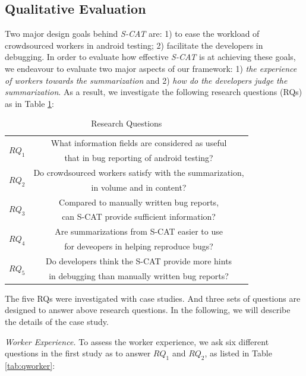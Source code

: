 \documentclass[10pt,conference]{IEEEtran}
\begin{document}
\subsection{Qualitative Evaluation}

Two major design goals behind \emph{S-CAT} are: 1) to ease the workload of crowdsourced workers in android testing; 2) facilitate
the developers in debugging. In order to evaluate how effective \emph{S-CAT} is at achieving these goals, we endeavour to evaluate
two major aspects of our framework: 1) \emph{the experience of workers towards the summarization} and 2) \emph{how do the developers
judge the summarization}. As a result, we investigate the following research questions (RQs) as in Table \ref{tab:rq}:

\begin{table}[!h]
\centering
\small
\caption{Research Questions}
\begin{tabular}{c|c} \hline
  \multirow{2}{*}{$RQ_1$} & What information fields are considered as useful\\& that in bug reporting of android testing?\\\hline
  \multirow{2}{*}{$RQ_2$} &Do crowdsourced workers satisfy with the summarization,\\& in volume and in content?\\ \hline
  \multirow{2}{*}{$RQ_3$} &Compared to manually written bug reports,\\& can S-CAT provide sufficient information?\\ \hline
  \multirow{2}{*}{$RQ_4$} &Are summarizations from S-CAT easier to use\\& for deveopers in helping reproduce bugs?\\ \hline
  \multirow{2}{*}{$RQ_5$} &Do developers think the S-CAT provide more hints\\& in debugging than manually written bug reports?\\ \hline
\end{tabular}
\label{tab:rq}
\end{table}

The five RQs were investigated with case studies. And three sets of questions are designed to answer above research questions.
In the following, we will describe the details of the case study.

\emph{Worker Experience.} To assess the worker experience, we ask six different questions in the first study as to answer $RQ_1$ and $RQ_2$,
as listed in Table \ref{tab:qworker}:
\end{document}
